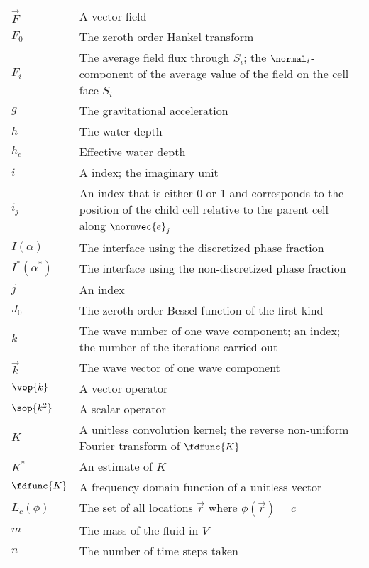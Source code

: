 \begin{center}
\begin{longtabu}{l X}
    $\vec{F}$           & A vector field \\
    $F_0$               & The zeroth order Hankel transform \\
    $F_i$               & The average field flux through $S_i$;
                          the $\normal_i$-component of the average value of the field on
                          the cell face $S_i$ \\
    $g$                 & The gravitational acceleration \\
    $h$                 & The water depth \\
    $h_e$               & Effective water depth \\
    $i$                 & A index; the imaginary unit \\
    $i_j$               & An index that is either 0 or 1 and corresponds to the position of the
                          child cell relative to the parent cell along $\normvec{e}_j$ \\
    $I(\alpha)$         & The interface using the discretized phase fraction \\
    $I^*(\alpha^*)$     & The interface using the non-discretized phase fraction \\
    $j$                 & An index \\
    $J_0$               & The zeroth order Bessel function of the first kind \\
    $k$                 & The wave number of one wave component; an index;
                          the number of the iterations carried out \\
    $\vec{k}$           & The wave vector of one wave component \\
    $\vop{k}$           & A vector operator \\
    $\sop{k^2}$         & A scalar operator \\
    $K$                 & A unitless convolution kernel;
                          the reverse non-uniform Fourier transform of $\fdfunc{K}$ \\
    $K^*$               & An estimate of $K$ \\
    $\fdfunc{K}$        & A frequency domain function of a unitless vector \\
    $L_c(\phi)$         & The set of all locations $\vec{r}$ where $\phi(\vec{r}) = c$ \\
    $m$                 & The mass of the fluid in $V$ \\
    $n$                 & The number of time steps taken \\

\end{longtabu}
\end{center}

